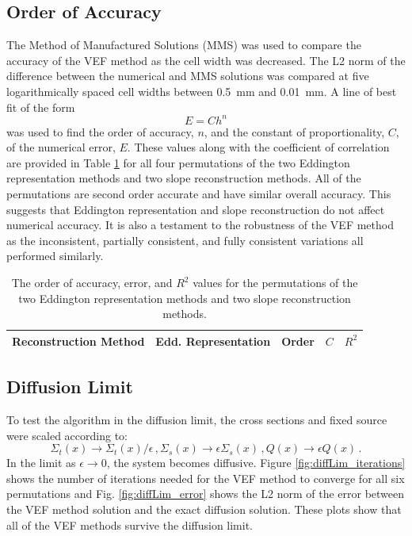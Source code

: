 \subsection{Order of Accuracy}
The Method of Manufactured Solutions (MMS) was used to compare the accuracy of the VEF method as the cell width was decreased. The L2 norm of the difference between the numerical and MMS solutions was compared at five logarithmically spaced cell widths between \SI{0.5}{mm} and \SI{0.01}{mm}. A line of best fit of the form 
	\begin{equation} 
		E = C h^n 
	\end{equation}
was used to find the order of accuracy, $n$, and the constant of proportionality, $C$, of the numerical error, $E$. These values along with the coefficient of correlation are provided in Table \ref{tab:mms} for all four permutations of the two Eddington representation methods and two slope reconstruction methods. All of the permutations are second order accurate and have similar overall accuracy. This suggests that Eddington representation and slope reconstruction do not affect numerical accuracy. It is also a testament to the robustness of the VEF method as the inconsistent, partially consistent, and fully consistent variations all performed similarly. 
	\begin{table}[!h] \centering
	\begin{tabular}{|c|c|c|c|c|}
	\hline
	\hline
	Reconstruction Method & Edd. Representation & Order & $C$ & $R^2$ \\ 
	\hline
		
	\hline
	\hline
	\end{tabular}
	\caption{The order of accuracy, error, and $R^2$ values for the permutations of the two Eddington representation methods and two slope reconstruction methods. }
	\label{tab:mms}
	\end{table}
	\afterpage{\clearpage}

\subsection{Diffusion Limit}
To test the algorithm in the diffusion limit, the cross sections and fixed source were scaled according to: 
	\begin{subequations} \label{res:scaling}
	\begin{equation} 
		\Sigma_t(x) \rightarrow \Sigma_t(x)/\epsilon\,, 
	\end{equation}
	\begin{equation}
		\Sigma_s(x) \rightarrow \epsilon \Sigma_s(x) \,,
	\end{equation}
	\begin{equation}
		Q(x) \rightarrow \epsilon Q(x)\,. 
	\end{equation}
	\end{subequations}
In the limit as $\epsilon \rightarrow 0$, the system becomes diffusive. Figure \ref{fig:diffLim_iterations} shows the number of iterations needed for the VEF method to converge for all six permutations and Fig. \ref{fig:diffLim_error} shows the L2 norm of the error between the VEF method solution and the exact diffusion solution. These plots show that all of the VEF methods survive the diffusion limit. 

